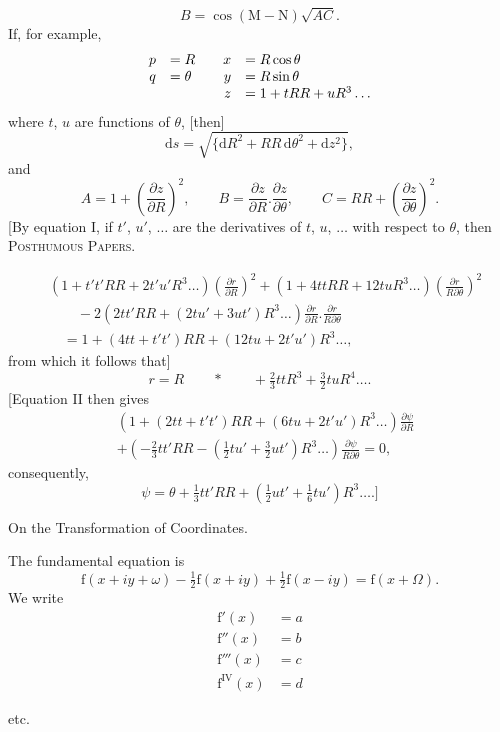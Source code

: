 \[
B=\cos(\mathrm M-\mathrm N)\sqrt{AC}.
\]
If, for example,
\[
\begin{array}{rl@{\qquad}rl}
p&=R&x&=R\cos\theta\\
q&=\theta&y&=R\sin\theta\\
&&z&=1+tRR+uR^3\ldots
\end{array}
\]
where $t$, $u$ are functions of $\theta$, [then]
\[
\mathrm ds=\sqrt{\{\mathrm dR^2+RR\,\mathrm d\theta^2+\mathrm dz^2\}},
\]
and
\[
A=1+\left(\frac{\partial z}{\partial R}\right)^2,\qquad
B=\frac{\partial z}{\partial R}.\frac{\partial z}{\partial\theta},\qquad
C=RR+\left(\frac{\partial z}{\partial\theta}\right)^2.
\]
[By equation I, if $t'$, $u'$, $\ldots$ are the derivatives of $t$, $u$, $\ldots$ with respect to $\theta$, then
\clearpage
{}\hfill\textsc{Posthumous Papers.}\hfill\mbox{}\par\medskip
\begingroup\small
\[
\begin{aligned}
&(1+t't'RR+2t'u'R^3\ldots)\left(\frac{\partial r}{\partial R}\right)^2
+(1+4ttRR+12tuR^3\ldots)\left(\frac{\partial r}{R\partial\theta}\right)^2\\
&\qquad-2(2tt'RR+(2tu'+3ut')R^3\ldots)\frac{\partial r}{\partial R}.\frac{\partial r}{R\partial\theta}\\
&\quad=1+(4tt+t't')RR+(12tu+2t'u')R^3\ldots,
\end{aligned}
\]
from which it follows that]
\[
r=R\qquad\ast\qquad+\tfrac23ttR^3+\tfrac32tuR^4\ldots.
\]
[Equation II then gives
\[
\begin{aligned}
&(1+(2tt+t't')RR+(6tu+2t'u')R^3\ldots)\frac{\partial\psi}{\partial R}\\
&+(-\tfrac23tt'RR-(\tfrac12tu'+\tfrac32ut')R^3\ldots)\frac{\partial\psi}{R\partial\theta}=0,
\end{aligned}
\]
consequently,
\[
\psi=\theta+\tfrac13tt'RR+(\tfrac12ut'+\tfrac16tu')R^3\ldots.]
\]
\bigskip
\begin{center}
On the Transformation of Coordinates.\par\medskip
[18.]
\end{center}
The fundamental equation is
\[
\mathrm f(x+iy+\omega)-\tfrac12\mathrm f(x+iy)+\tfrac12\mathrm f(x-iy)=\mathrm f(x+\Omega).
\]
We write
\[
\begin{aligned}
\mathrm f'(x)&=a\\
\mathrm f''(x)&=b\\
\mathrm f'''(x)&=c\\
\mathrm f^{\mathrm{IV}}(x)&=d
\end{aligned}
\]
\begin{center}etc.\end{center}
